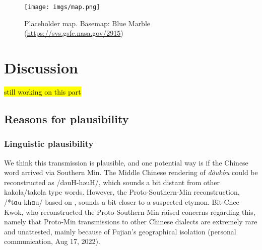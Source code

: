 \documentclass[12pt]{article}
\begin{document}


\begin{figure}[ht]
    \centering
    \texttt{[image: imgs/map.png]}
    \caption{Placeholder map. Basemap: Blue Marble (\url{https://svs.gsfc.nasa.gov/2915})}
    \label{fig:map}
\end{figure}


\section{Discussion}

\hl{still working on this part}

\subsection{Reasons for plausibility}

\subsubsection{Linguistic plausibility}

We think this transmission is plausible, and one potential way is if the Chinese word arrived via Southern Min. The Middle Chinese rendering of \textit{dòukòu} could be reconstructed as /dəuH-həuH/, which sounds a bit distant from other kakola/takola type words. However, the Proto-Southern-Min reconstruction, /*tɑu-khɑu/ based on \textcite{kwok_2018_southern}, sounds a bit closer to a suspected etymon. Bit-Chee Kwok, who reconstructed the Proto-Southern-Min raised concerns regarding this, namely that Proto-Min transmissions to other Chinese dialects are extremely rare and unattested, mainly because of Fujian's geographical isolation (personal communication, Aug 17, 2022).
\end{document}

